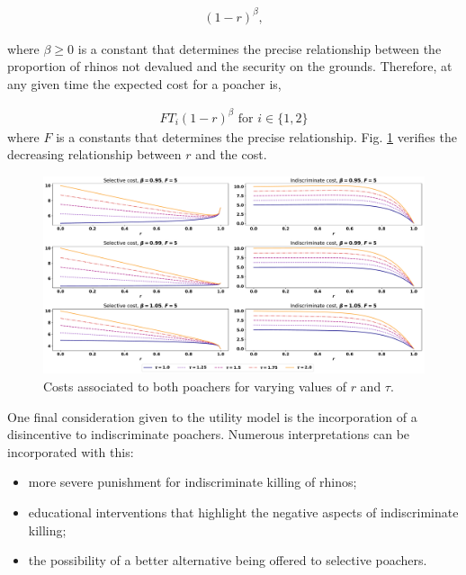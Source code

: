 \documentclass[10pt]{article}
\begin{document}
\begin{eqnarray}
    \label{eqn:risk}
    (1 - r)^{\beta},
\end{eqnarray}

where \(\beta \geq 0\) is a constant that determines the precise relationship
between the proportion of rhinos not devalued and the security on the grounds.
Therefore, at any given time the expected cost for a poacher is,

\begin{eqnarray}
    \label{eqn:cost}
        FT_i(1 - r)^{\beta} \text{ for } i \in \{1, 2\}
\end{eqnarray}
where \(F\) is a constants that determines the precise relationship. Fig.
\ref{fig:CostCurves} verifies the decreasing relationship between \(r\) and the
cost.

\begin{figure}[!htbp]
    \begin{center}
        \includegraphics[width=\linewidth]{images/betas_curve.pdf}
        \caption{Costs associated to both poachers for varying values of \(r\)
        and \(\tau\).}\label{fig:CostCurves}
    \end{center}
\end{figure}

One final consideration given to the utility model is the incorporation of a
disincentive to indiscriminate poachers. Numerous interpretations can be
incorporated with this:

\begin{itemize}
    \item more severe punishment for indiscriminate killing of rhinos;
    \item educational interventions that highlight the negative aspects of
        indiscriminate killing;
    \item the possibility of a better alternative being offered to selective
        poachers.
\end{itemize}
\end{document}
